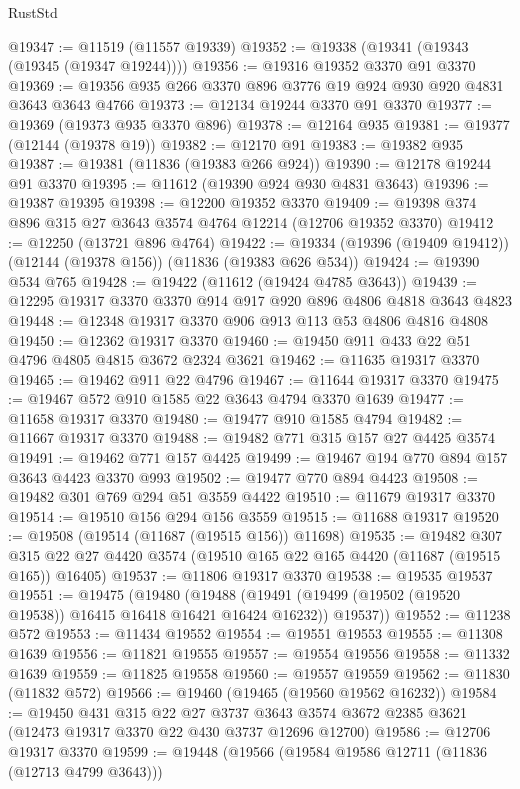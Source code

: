 \begin{lexlean}{RustStd}
\begin{coremodule}
@19347 := @11519 (@11557 @19339)
@19352 := @19338 (@19341 (@19343 (@19345 (@19347 @19244))))
@19356 := @19316 @19352 @3370 @91 @3370
@19369 := @19356 @935 @266 @3370 @896 @3776 @19 @924 @930 @920 @4831 @3643 @3643 @4766
@19373 := @12134 @19244 @3370 @91 @3370
@19377 := @19369 (@19373 @935 @3370 @896)
@19378 := @12164 @935
@19381 := @19377 (@12144 (@19378 @19))
@19382 := @12170 @91
@19383 := @19382 @935
@19387 := @19381 (@11836 (@19383 @266 @924))
@19390 := @12178 @19244 @91 @3370
@19395 := @11612 (@19390 @924 @930 @4831 @3643)
@19396 := @19387 @19395
@19398 := @12200 @19352 @3370
@19409 := @19398 @374 @896 @315 @27 @3643 @3574 @4764 @12214 (@12706 @19352 @3370)
@19412 := @12250 (@13721 @896 @4764)
@19422 := @19334 (@19396 (@19409 @19412)) (@12144 (@19378 @156)) (@11836 (@19383 @626 @534))
@19424 := @19390 @534 @765
@19428 := @19422 (@11612 (@19424 @4785 @3643))
@19439 := @12295 @19317 @3370 @3370 @914 @917 @920 @896 @4806 @4818 @3643 @4823
@19448 := @12348 @19317 @3370 @906 @913 @113 @53 @4806 @4816 @4808
@19450 := @12362 @19317 @3370
@19460 := @19450 @911 @433 @22 @51 @4796 @4805 @4815 @3672 @2324 @3621
@19462 := @11635 @19317 @3370
@19465 := @19462 @911 @22 @4796
@19467 := @11644 @19317 @3370
@19475 := @19467 @572 @910 @1585 @22 @3643 @4794 @3370 @1639
@19477 := @11658 @19317 @3370
@19480 := @19477 @910 @1585 @4794
@19482 := @11667 @19317 @3370
@19488 := @19482 @771 @315 @157 @27 @4425 @3574
@19491 := @19462 @771 @157 @4425
@19499 := @19467 @194 @770 @894 @157 @3643 @4423 @3370 @993
@19502 := @19477 @770 @894 @4423
@19508 := @19482 @301 @769 @294 @51 @3559 @4422
@19510 := @11679 @19317 @3370
@19514 := @19510 @156 @294 @156 @3559
@19515 := @11688 @19317
@19520 := @19508 (@19514 (@11687 (@19515 @156)) @11698)
@19535 := @19482
    @307
    @315
    @22
    @27
    @4420
    @3574
    (@19510 @165 @22 @165 @4420 (@11687 (@19515 @165)) @16405)
@19537 := @11806 @19317 @3370
@19538 := @19535 @19537
@19551 := @19475
    (@19480
      (@19488 (@19491 (@19499 (@19502 (@19520 @19538)) @16415 @16418 @16421 @16424 @16232)) @19537))
@19552 := @11238 @572
@19553 := @11434 @19552
@19554 := @19551 @19553
@19555 := @11308 @1639
@19556 := @11821 @19555
@19557 := @19554 @19556
@19558 := @11332 @1639
@19559 := @11825 @19558
@19560 := @19557 @19559
@19562 := @11830 (@11832 @572)
@19566 := @19460 (@19465 (@19560 @19562 @16232))
@19584 := @19450
    @431
    @315
    @22
    @27
    @3737
    @3643
    @3574
    @3672
    @2385
    @3621
    (@12473 @19317 @3370 @22 @430 @3737 @12696 @12700)
@19586 := @12706 @19317 @3370
@19599 := @19448
    (@19566
      (@19584 @19586 @12711 (@11836 (@12713 @4799 @3643)))

\end{coremodule}
\end{lexlean}
